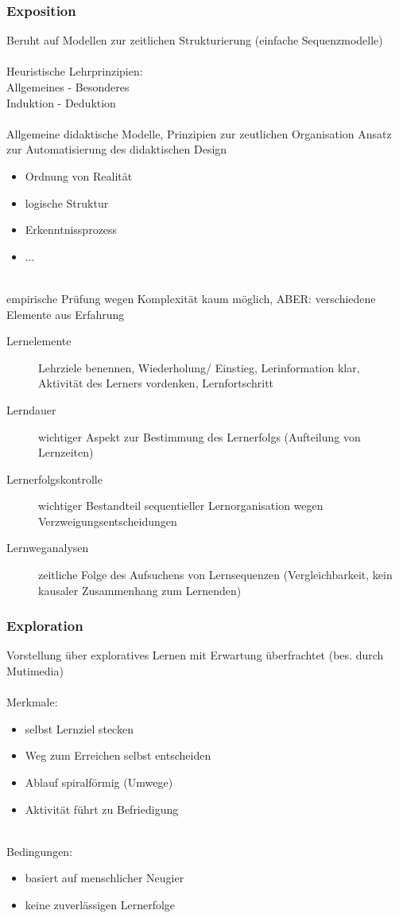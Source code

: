 \documentclass[a4paper]{article}
\begin{document}
\subsubsection{Exposition}

Beruht auf Modellen zur zeitlichen Strukturierung (einfache Sequenzmodelle)
\\~\\
Heuristische Lehrprinzipien:\\
Allgemeines - Besonderes\\
Induktion - Deduktion\\
\\
Allgemeine didaktische Modelle, Prinzipien zur zeutlichen Organisation
\textrightarrow Ansatz zur Automatisierung des didaktischen Design
\begin{itemize}
	\item Ordnung von Realität
	\item logische Struktur
	\item Erkenntnissprozess
	\item ...
\end{itemize}
~\\
empirische Prüfung wegen Komplexität kaum möglich, ABER: \textrightarrow verschiedene Elemente aus Erfahrung

\begin{description}
	\item[Lernelemente] Lehrziele benennen, Wiederholung/ Einstieg, Lerinformation klar, Aktivität des Lerners vordenken, Lernfortschritt
	\item[Lerndauer] wichtiger Aspekt zur Bestimmung des Lernerfolgs (Aufteilung von Lernzeiten)
	\item[Lernerfolgskontrolle] wichtiger Bestandteil sequentieller Lernorganisation wegen Verzweigungsentscheidungen
	\item[Lernweganalysen] zeitliche Folge des Aufsuchens von Lernsequenzen (Vergleichbarkeit, kein kausaler Zusammenhang zum Lernenden)
\end{description}

\subsubsection{Exploration}

Vorstellung über exploratives Lernen mit Erwartung überfrachtet (bes. durch Mutimedia)
\\~\\
Merkmale:
\begin{itemize}
	\item selbst Lernziel stecken
	\item Weg zum Erreichen selbst entscheiden
	\item Ablauf spiralförmig (Umwege)
	\item Aktivität führt zu Befriedigung
\end{itemize}
~\\
Bedingungen:
\begin{itemize}
	\item basiert auf menschlicher Neugier
	\item keine zuverlässigen Lernerfolge
\end{itemize}
\end{document}
